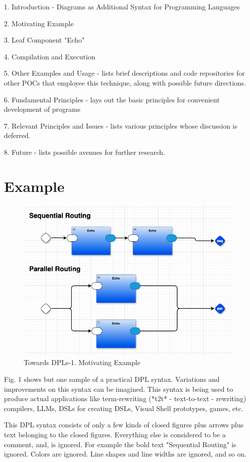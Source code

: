 \documentclass[10pt]{acmart}
\begin{document}
1. Introduction - Diagrams as Additional Syntax for Programming
Languages

2. Motivating Example

3. Leaf Component "Echo"

4. Compilation and Execution

5. Other Examples and Usage - lists brief descriptions and
code repositories for other POCs that employee this technique, along
with possible future directions.

6. Fundamental Principles - lays out the basic principles
for convenient development of programs

7. Relevant Principles and Issues - lists various
principles whose discussion is deferred.

8. Future - lists possible avenues for further research.

\section{Example}

  \begin{figure}[h]
    \centering
    \includegraphics[width=0.8\linewidth]{./media/HelloWorld0D.png}
    \caption{Towards DPLs-1. Motivating Example}
    \label{fig:convert_to_json}
  \end{figure}

Fig. 1 shows but one sample of a practical DPL syntax. Variations and
improvements on this syntax can be imagined. This syntax is being used
to produce actual applications like term-rewriting (*t2t* -
text-to-text - rewriting) compilers, LLMs, DSLs for creating DSLs,
Visual Shell prototypes, games, etc.

This DPL syntax consists of only a few kinds of closed figures plus
arrows plus text belonging to the closed figures. Everything else is
considered to be a comment, and, is ignored. For example the bold text
"Sequential Routing" is ignored. Colors are ignored. Line shapes and
line widths are ignored, and so on.
\end{document}
